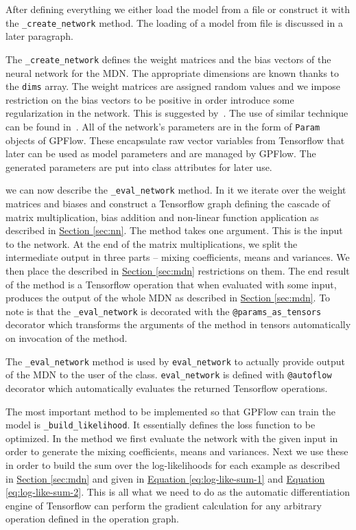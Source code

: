 \documentclass[12pt,a4paper,twoside]{scrartcl}
\numberwithin{equation}{section}
\newcommand{\refsec}[1]{\hyperref[#1]{Section \ref*{#1}}}
\renewcommand*{\refeq}[1]{\hyperref[#1]{Equation \ref*{#1}}}
\begin{document}
After defining everything we either load the model from a file or construct it with the \texttt{\_create\_network} method. The loading of a model from file is discussed in a later paragraph.

The \texttt{\_create\_network} defines the weight matrices and the bias vectors of the neural network for the MDN. The appropriate dimensions are known thanks to the \texttt{dims} array. The weight matrices are assigned random values and we impose restriction on the bias vectors to be positive in order introduce some regularization in the network. This is suggested by~\cite{mdntut}. The use of similar technique can be found in~\cite{chorowski2015}. All of the network's parameters are in the form of \texttt{Param} objects of GPFlow. These encapsulate raw vector variables from Tensorflow that later can be used as model parameters and are managed by GPFlow. The generated parameters are put into class attributes for later use.

we can now describe the \texttt{\_eval\_network} method. In it we iterate over the weight matrices and biases and construct a Tensorflow graph defining the cascade of matrix multiplication, bias addition and non-linear function application as described in \refsec{sec:nn}. The method takes one argument. This is the input to the network. At the end of the matrix multiplications, we split the intermediate output in three parts -- mixing coefficients, means and variances. We then place the described in \refsec{sec:mdn} restrictions on them. The end result of the method is a Tensorflow operation that when evaluated with some input, produces the output of the whole MDN as described in \refsec{sec:mdn}. To note is that the \texttt{\_eval\_network} is decorated with the \texttt{@params\_as\_tensors} decorator which transforms the arguments of the method in tensors automatically on invocation of the method.

The \texttt{\_eval\_network} method is used by \texttt{eval\_network} to actually provide output of the MDN to the user of the class. \texttt{eval\_network} is defined with \texttt{@autoflow} decorator which automatically evaluates the returned Tensorflow operations.

The most important method to be implemented so that GPFlow can train the model is \texttt{\_build\_likelihood}. It essentially defines the loss function to be optimized. In the method we first evaluate the network with the given input in order to generate the mixing coefficients, means and variances. Next we use these in order to build the sum over the log-likelihoods for each example as described in \refsec{sec:mdn} and given in \refeq{eq:log-like-sum-1} and \refeq{eq:log-like-sum-2}. This is all what we need to do as the automatic differentiation engine of Tensorflow can perform the gradient calculation for any arbitrary operation defined in the operation graph. 
\end{document}

